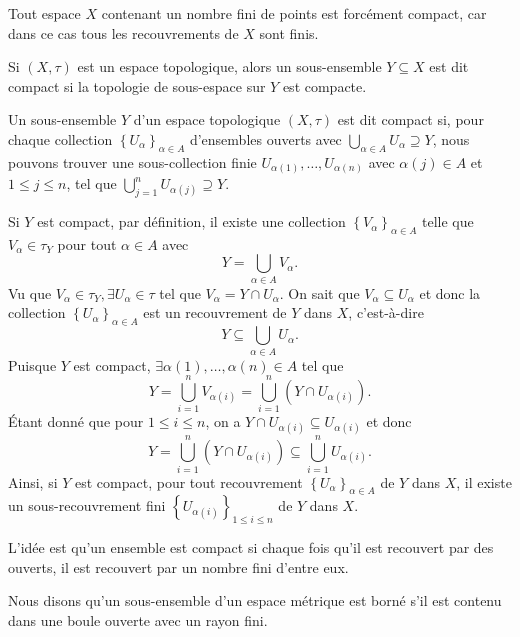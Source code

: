 \documentclass[french]{article}
\begin{document}
\begin{remarque}
  Tout espace $X$ contenant un nombre fini de points est forcément compact, car dans ce cas tous les recouvrements de $X$ sont finis.
\end{remarque}

\begin{definition}
  Si $(X, \tau)$ est un espace topologique, alors un sous-ensemble $Y \subseteq X$ est dit compact si la topologie de sous-espace sur $Y$ est compacte.
\end{definition}

\begin{lemme}
  Un sous-ensemble $Y$ d'un espace topologique $(X, \tau)$ est dit compact si, pour chaque collection $\left\{ U_\alpha \right\}_{\alpha \in A}$ d'ensembles ouverts avec $\bigcup\limits_{\alpha \in A} U_\alpha \supseteq Y$, nous pouvons trouver une sous-collection finie $U_{\alpha(1)}, \dots, U_{\alpha(n)}$ avec $\alpha(j) \in A$ et $1 \leq j \leq n$, tel que $\bigcup\limits_{j=1}^n U_{\alpha(j)} \supseteq Y$.

  \tcblower
  \begin{preuve}
    Si $Y$ est compact, par définition, il existe une collection $\left\{ V_\alpha \right\}_{\alpha \in A}$ telle que $V_\alpha \in \tau_Y$ pour tout $\alpha \in A$ avec $$Y = \bigcup_{\alpha \in A} V_\alpha.$$
    Vu que $V_\alpha \in \tau_Y, \exists U_\alpha \in \tau$ tel que $V_\alpha = Y \cap U_\alpha$. On sait que  $V_\alpha \subseteq U_\alpha$ et donc la collection $\left\{ U_\alpha \right\}_{\alpha \in A}$ est un recouvrement de $Y$ dans $X$, c'est-à-dire  $$Y \subseteq \bigcup_{\alpha \in A} U_\alpha.$$
    Puisque $Y$ est compact, $\exists \alpha(1), \dots, \alpha(n) \in A$ tel que
    $$Y = \bigcup_{i=1}^n V_{\alpha(i)} = \bigcup_{i=1}^n \left( Y \cap U_{\alpha(i)} \right).$$
    Étant donné que pour $1 \leq i \leq n$, on a $Y \cap U_{\alpha(i)} \subseteq U_{\alpha(i)}$ et donc
    $$Y = \bigcup_{i=1}^n \left( Y \cap U_{\alpha(i)} \right) \subseteq \bigcup_{i=1}^n U_{\alpha(i)}.$$
    Ainsi, si $Y$ est compact, pour tout recouvrement $\left\{ U_\alpha \right\}_{\alpha \in A}$ de $Y$ dans $X$, il existe un sous-recouvrement fini $\left\{ U_{\alpha(i)} \right\}_{1 \leq i \leq n}$ de $Y$ dans $X$.
  \end{preuve}
\end{lemme}

L'idée est qu'un ensemble est compact si chaque fois qu'il est recouvert par des ouverts, il est recouvert par un nombre fini d'entre eux.
\par Nous disons qu’un sous-ensemble d’un espace métrique est borné s’il est contenu dans une boule ouverte avec un rayon fini.
\end{document}
